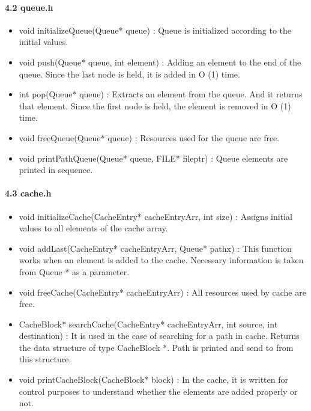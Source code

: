 \documentclass[a4paper,12pt]{report}
\begin{document}
\paragraph{4.2 queue.h\newline}
\begin{itemize}
    \item void initializeQueue(Queue* queue) : Queue is initialized according to the initial values.
    \item void push(Queue* queue, int element) : Adding an element to the end of the queue. Since the last node is held, it is added in O (1) time.
    \item int pop(Queue* queue) : Extracts an element from the queue. And it returns that element. Since the first node is held, the element is removed in O (1) time.
    \item void freeQueue(Queue* queue) : Resources used for the queue are free.
    \item void printPathQueue(Queue* queue, FILE* fileptr) : Queue elements are printed in sequence.
\end{itemize}

\newpage
\paragraph{4.3 cache.h\newline}
\begin{itemize}
    \item void initializeCache(CacheEntry* cacheEntryArr, int size) : Assigns initial values to all elements of the cache array.
    \item void addLast(CacheEntry* cacheEntryArr, Queue* pathx) : This function works when an element is added to the cache. Necessary information is taken from Queue * as a parameter.    
    \item void freeCache(CacheEntry* cacheEntryArr) : All resources used by cache are free.
    \item CacheBlock* searchCache(CacheEntry* cacheEntryArr, int source, int destination) : It is used in the case of searching for a path in cache. Returns the data structure of type CacheBlock *. Path is printed and send to from this structure.
    \item void printCacheBlock(CacheBlock* block) : In the cache, it is written for control purposes to understand whether the elements are added properly or not.
\end{itemize}
\end{document}
